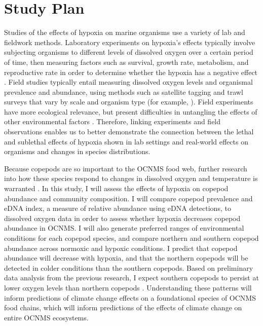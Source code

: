 \documentclass[12pt,twoside]{reedthesis}
\begin{document}
\section{Study Plan}

Studies of the effects of hypoxia on marine organisms use a variety of lab and fieldwork methods. Laboratory experiments on hypoxia's effects typically involve subjecting organisms to different levels of dissolved oxygen over a certain period of time, then measuring factors such as survival, growth rate, metabolism, and reproductive rate in order to determine whether the hypoxia has a negative effect \autocite{Steckbauer2020}. Field studies typically entail measuring dissolved oxygen levels and organismal prevalence and abundance, using methods such as satellite tagging and trawl surveys that vary by scale and organism type (for example, \autocite{Keister2020}). Field experiments have more ecological relevance, but present difficulties in untangling the effects of other environmental factors \autocite{Borges2022, Boyd2018}. Therefore, linking experiments and field observations enables us to better demonstrate the connection between the lethal and sublethal effects of hypoxia shown in lab settings and real-world effects on organisms and changes in species distributions.

 Because copepods are so important to the OCNMS food web, further research into how these species respond to changes in dissolved oxygen and temperature is warranted \autocite{NOAAFisheries2024}. In this study, I will assess the effects of hypoxia on copepod abundance and community composition. I will compare copepod prevalence and eDNA index, a measure of relative abundance using eDNA detections, to dissolved oxygen data in order to assess whether hypoxia decreases copepod abundance in OCNMS. I will also generate preferred ranges of environmental conditions for each copepod species, and compare northern and southern copepod abundance across normoxic and hypoxic conditions. I predict that copepod abundance will decrease with hypoxia, and that the northern copepods will be detected in colder conditions than the southern copepods. Based on preliminary data analysis from the previous research, I expect southern copepods to persist at lower oxygen levels than northern copepods \autocite{Crotty2024}. Understanding these patterns will inform predictions of climate change effects on a foundational species of OCNMS food chains, which will inform predictions of the effects of climate change on entire OCNMS ecosystems.
	
\end{document}
